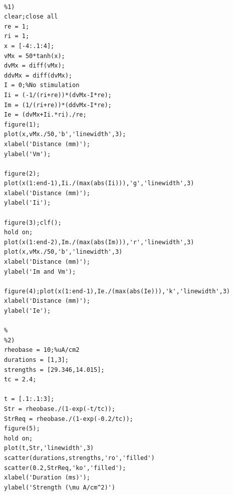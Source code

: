 \documentclass[12pt]{article}
\begin{document}
\begin{lstlisting}[style=Matlab-editor]

%1)
clear;close all
re = 1;
ri = 1;
x = [-4:.1:4];
vMx = 50*tanh(x);
dvMx = diff(vMx);
ddvMx = diff(dvMx);
I = 0;%No stimulation
Ii = (-1/(ri+re))*(dvMx-I*re);
Im = (1/(ri+re))*(ddvMx-I*re);
Ie = (dvMx+Ii.*ri)./re;
figure(1);
plot(x,vMx./50,'b','linewidth',3);
xlabel('Distance (mm)');
ylabel('Vm');

figure(2);
plot(x(1:end-1),Ii./(max(abs(Ii))),'g','linewidth',3)
xlabel('Distance (mm)');
ylabel('Ii');

figure(3);clf();
hold on;
plot(x(1:end-2),Im./(max(abs(Im))),'r','linewidth',3)
plot(x,vMx./50,'b','linewidth',3)
xlabel('Distance (mm)');
ylabel('Im and Vm');

figure(4);plot(x(1:end-1),Ie./(max(abs(Ie))),'k','linewidth',3)
xlabel('Distance (mm)');
ylabel('Ie');

%
%2)
rheobase = 10;%uA/cm2
durations = [1,3];
strengths = [29.346,14.015];
tc = 2.4;

t = [.1:.1:3];
Str = rheobase./(1-exp(-t/tc));
StrReq = rheobase./(1-exp(-0.2/tc));
figure(5);
hold on;
plot(t,Str,'linewidth',3)
scatter(durations,strengths,'ro','filled')
scatter(0.2,StrReq,'ko','filled');
xlabel('Duration (ms)');
ylabel('Strength (\mu A/cm^2)')





\end{lstlisting}
\end{document}
